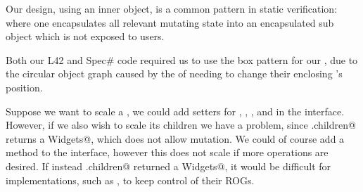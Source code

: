 Our design, using an inner \Q@Box@ object, is a common pattern in static verification: where one encapsulates all relevant mutating state into an encapsulated sub object which is not exposed to users.

Both our L42 and Spec\# code required us to use the box pattern for our \Q@SafeMovable@, due to the circular object graph caused by the \Q@Action@s of \Q@Button@s needing to change their enclosing \Q@SafeMovable@'s position.

Suppose we want to scale a \Q@Widget@, we could add \Q@mut@ setters for \Q@width@, \Q@height@, \Q@left@, and \Q@top@ in the \Q@Widget@ interface. However, if we also wish to scale its children we have a problem, since \Q@Widget.children@ returns a \Q@read Widgets@, which does not allow mutation. We could of course add a \Q@mut@ method \Q@zoom@ to the \Q@Widget@ interface, however this does not scale if more operations are desired. If instead \Q@Widget.children@ returned a \Q@mut Widgets@, it would be difficult for \Q@Widget@ implementations, such as \Q@SafeMovable@, to keep control of their ROGs.



